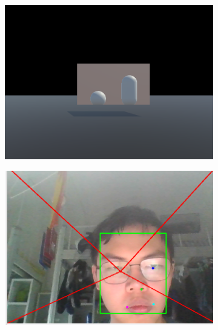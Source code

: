 \begin{figure}
\begin{subfigure}[t]{0.45\linewidth}
        \includegraphics[width=1\textwidth]{figures/Implementation/illusion_2.png}
    \end{subfigure}
    \begin{subfigure}[t]{0.45\linewidth}
        \centering
        \includegraphics[width=1\textwidth]{figures/Implementation/illusion_2_face.png}
    \end{subfigure}
    \begin{subfigure}[t]{0.45\linewidth}
        \centering

\end{subfigure}
\end{figure}
